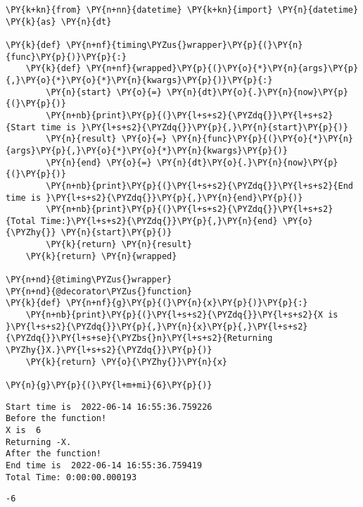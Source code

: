     \begin{tcolorbox}[breakable, size=fbox, boxrule=1pt, pad at break*=1mm,colback=cellbackground, colframe=cellborder]
\begin{Verbatim}[commandchars=\\\{\}]
\PY{k+kn}{from} \PY{n+nn}{datetime} \PY{k+kn}{import} \PY{n}{datetime} \PY{k}{as} \PY{n}{dt}

\PY{k}{def} \PY{n+nf}{timing\PYZus{}wrapper}\PY{p}{(}\PY{n}{func}\PY{p}{)}\PY{p}{:}
    \PY{k}{def} \PY{n+nf}{wrapped}\PY{p}{(}\PY{o}{*}\PY{n}{args}\PY{p}{,}\PY{o}{*}\PY{o}{*}\PY{n}{kwargs}\PY{p}{)}\PY{p}{:}
        \PY{n}{start} \PY{o}{=} \PY{n}{dt}\PY{o}{.}\PY{n}{now}\PY{p}{(}\PY{p}{)}
        \PY{n+nb}{print}\PY{p}{(}\PY{l+s+s2}{\PYZdq{}}\PY{l+s+s2}{Start time is }\PY{l+s+s2}{\PYZdq{}}\PY{p}{,}\PY{n}{start}\PY{p}{)}
        \PY{n}{result} \PY{o}{=} \PY{n}{func}\PY{p}{(}\PY{o}{*}\PY{n}{args}\PY{p}{,}\PY{o}{*}\PY{o}{*}\PY{n}{kwargs}\PY{p}{)}
        \PY{n}{end} \PY{o}{=} \PY{n}{dt}\PY{o}{.}\PY{n}{now}\PY{p}{(}\PY{p}{)}
        \PY{n+nb}{print}\PY{p}{(}\PY{l+s+s2}{\PYZdq{}}\PY{l+s+s2}{End time is }\PY{l+s+s2}{\PYZdq{}}\PY{p}{,}\PY{n}{end}\PY{p}{)}
        \PY{n+nb}{print}\PY{p}{(}\PY{l+s+s2}{\PYZdq{}}\PY{l+s+s2}{Total Time:}\PY{l+s+s2}{\PYZdq{}}\PY{p}{,}\PY{n}{end} \PY{o}{\PYZhy{}} \PY{n}{start}\PY{p}{)}
        \PY{k}{return} \PY{n}{result}
    \PY{k}{return} \PY{n}{wrapped}

\PY{n+nd}{@timing\PYZus{}wrapper}
\PY{n+nd}{@decorator\PYZus{}function}
\PY{k}{def} \PY{n+nf}{g}\PY{p}{(}\PY{n}{x}\PY{p}{)}\PY{p}{:}
    \PY{n+nb}{print}\PY{p}{(}\PY{l+s+s2}{\PYZdq{}}\PY{l+s+s2}{X is }\PY{l+s+s2}{\PYZdq{}}\PY{p}{,}\PY{n}{x}\PY{p}{,}\PY{l+s+s2}{\PYZdq{}}\PY{l+s+se}{\PYZbs{}n}\PY{l+s+s2}{Returning \PYZhy{}X.}\PY{l+s+s2}{\PYZdq{}}\PY{p}{)}
    \PY{k}{return} \PY{o}{\PYZhy{}}\PY{n}{x}

\PY{n}{g}\PY{p}{(}\PY{l+m+mi}{6}\PY{p}{)}
\end{Verbatim}
\end{tcolorbox}

    \begin{Verbatim}[commandchars=\\\{\}]
Start time is  2022-06-14 16:55:36.759226
Before the function!
X is  6
Returning -X.
After the function!
End time is  2022-06-14 16:55:36.759419
Total Time: 0:00:00.000193
    \end{Verbatim}

            \begin{tcolorbox}[breakable, size=fbox, boxrule=.5pt, pad at break*=1mm, opacityfill=0]
\begin{Verbatim}[commandchars=\\\{\}]
-6
\end{Verbatim}
\end{tcolorbox}
        

